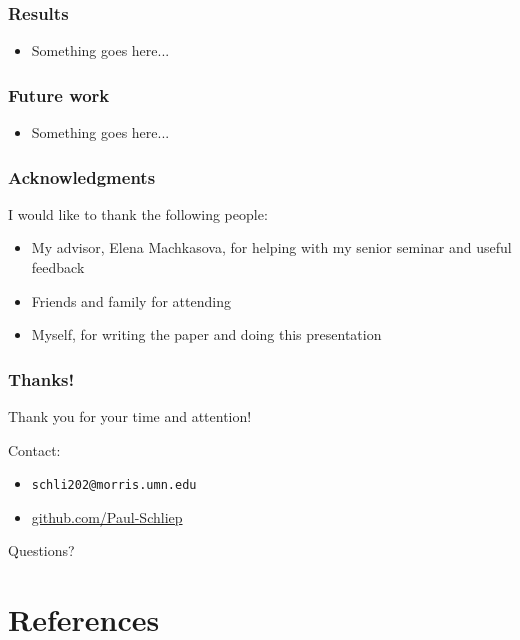 \documentclass{beamer}
\newcommand{\linespace}{\vskip 0.25cm}
\begin{document}
\begin{frame}
	\frametitle{Results}
		\begin{itemize}
			\item Something goes here...
		\end{itemize}

\end{frame}

\begin{frame}
	\frametitle{Future work}
		\begin{itemize}
			\item Something goes here...
		\end{itemize}

\end{frame}

\begin{frame}
	\frametitle{Acknowledgments}
	I would like to thank the following people:
		\begin{itemize}
			\item My advisor, Elena Machkasova, for helping with my senior seminar and useful feedback
			\item Friends and family for attending
			\item Myself, for writing the paper and doing this presentation
		\end{itemize}

\end{frame}

\begin{frame}
	\frametitle{Thanks!}
	
	Thank you for your time and attention!
		
	\linespace
	\linespace
	
	Contact:  
	\begin{itemize}
		\item \texttt{schli202@morris.umn.edu}
		\item \url{github.com/Paul-Schliep}
	\end{itemize}
	
	\linespace
	\linespace
	
	\begin{center}
	{\huge Questions?}
	\end{center}
\end{frame}

\section*{References}
\end{document}
